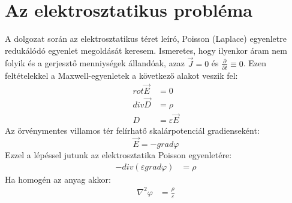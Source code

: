 \section{Az elektrosztatikus probléma}
A dolgozat során az elektrosztatikus téret leíró, Poisson (Laplace) egyenletre
redukálódó egyenlet megoldását keresem.
Ismeretes, hogy ilyenkor áram nem folyik és a gerjesztő menniységek állandóak, 
azaz $\vec{J} = 0$ és $\frac{\partial}{\partial t} \equiv 0$. Ezen feltételekkel a Maxwell-egyenletek a következő alakot veszik fel:
\begin{align}
rot \vec{E} &= 0\\
div \vec{D} &= \rho\\
D &= \varepsilon \vec{E}
\end{align}
Az örvénymentes villamos tér felírhatő skalárpotenciál gradienseként:
\begin{equation}
\vec{E} = - grad \varphi
\end{equation}
Ezzel a lépéssel jutunk az elektrosztatika Poisson egyenletére:
\begin{align}
-div(\varepsilon grad \varphi ) &= \rho
\end{align}
Ha homogén az anyag akkor:
\begin{align}
	\nabla^2\varphi  &= \frac{\rho}{\varepsilon}
\end{align}






























